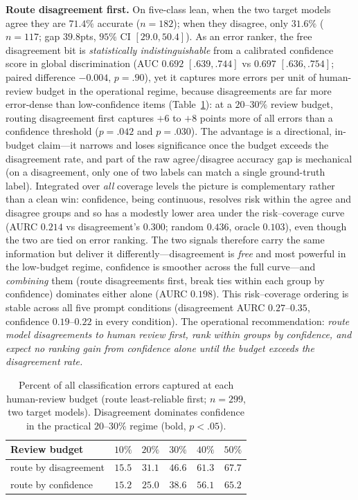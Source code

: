 \documentclass{article}
\begin{document}
\textbf{Route disagreement first.} On five-class lean, when the two
target models agree they are $71.4\%$ accurate ($n{=}182$); when they
disagree, only $31.6\%$ ($n{=}117$; gap $39.8$pts, $95\%$ CI $[29.0,
50.4]$). As an error ranker, the free disagreement bit is
\emph{statistically indistinguishable} from a calibrated confidence
score in global discrimination (AUC $0.692$ $[.639,.744]$ vs $0.697$
$[.636,.754]$; paired difference $-0.004$, $p{=}.90$), yet it captures
more errors per unit of human-review budget in the operational regime,
because disagreements are far more error-dense than low-confidence items
(Table~\ref{tab:router}): at a $20$--$30\%$ review budget, routing
disagreement first captures $+6$ to $+8$ points more of all errors than
a confidence threshold ($p{=}.042$ and $p{=}.030$). The advantage is a
directional, in-budget claim---it narrows and loses significance once the
budget exceeds the disagreement rate, and part of the raw agree/disagree
accuracy gap is mechanical (on a disagreement, only one of two labels can
match a single ground-truth label). Integrated over \emph{all} coverage
levels the picture is complementary rather than a clean win: confidence,
being continuous, resolves risk within the agree and disagree groups and
so has a modestly lower area under the risk--coverage curve
(AURC $0.214$ vs disagreement's $0.300$; random $0.436$, oracle $0.103$),
even though the two are tied on error ranking. The two signals therefore
carry the same information but deliver it differently---disagreement is
\emph{free} and most powerful in the low-budget regime, confidence is
smoother across the full curve---and \emph{combining} them (route
disagreements first, break ties within each group by confidence)
dominates either alone (AURC $0.198$). This risk--coverage ordering is
stable across all five prompt conditions (disagreement AURC
$0.27$--$0.35$, confidence $0.19$--$0.22$ in every condition). The
operational recommendation: \emph{route model disagreements to human
review first, rank within groups by confidence, and expect no
ranking gain from confidence alone until the budget exceeds the
disagreement rate.}

\begin{table}[h]\centering\small
\begin{tabular}{lccccc}
\toprule
Review budget & $10\%$ & $20\%$ & $30\%$ & $40\%$ & $50\%$ \\
\midrule
route by disagreement & $15.5$ & $\mathbf{31.1}$ & $\mathbf{46.6}$ & $61.3$ & $67.7$ \\
route by confidence & $15.2$ & $25.0$ & $38.6$ & $56.1$ & $65.2$ \\
\bottomrule
\end{tabular}
\caption{Percent of all classification errors captured at each
human-review budget (route least-reliable first; $n{=}299$, two target
models). Disagreement dominates confidence in the practical
$20$--$30\%$ regime (bold, $p{<}.05$).}
\label{tab:router}
\end{table}
\end{document}
